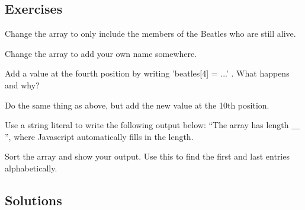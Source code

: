 \documentclass[11pt,a4paper]{report}
\begin{document}
\subsection{Exercises}

\begin{ex}
Change the array to only include the members of the Beatles who are still alive.
\end{ex}

\begin{ex}
Change the array to add your own name somewhere.
\end{ex}

\begin{ex}
Add a value at the fourth position by writing 'beatles[4] = ...' . What happens and why?
\end{ex}

\begin{ex}
Do the same thing as above, but add the new value at the 10th position.
\end{ex}

\begin{ex}
Use a string literal to write the following output below: ``The array has length $\_\_\_$'', where Javascript automatically fills in the length.
\end{ex}

\begin{ex}
Sort the array and show your output. Use this to find the first and last entries alphabetically.
\end{ex}


\subsection{Solutions}
\end{document}

